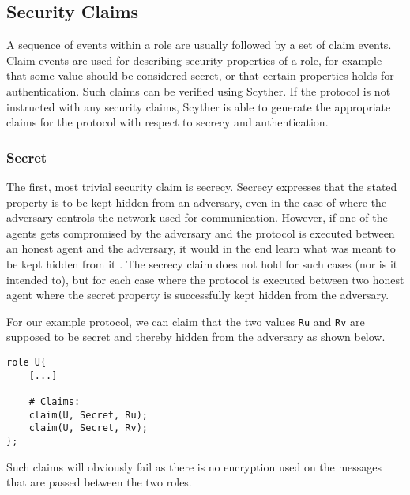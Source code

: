 %	

\subsection{Security Claims}

A sequence of events within a role are usually followed by a set of claim events. Claim events are used for describing security properties of a role, for example that some value should be considered secret, or that certain properties holds for authentication. Such claims can be verified using Scyther. If the protocol is not instructed with any security claims, Scyther is able to generate the appropriate claims  for the protocol with respect to secrecy and authentication.

\subsubsection{Secret}

The first, most trivial security claim is secrecy. Secrecy expresses that the stated property is to be kept hidden from an adversary, even in the case of where the adversary controls the network used for communication. However, if one of the agents gets compromised by the adversary and the protocol is executed between an honest agent and the adversary, it would in the end learn what was meant to be kept hidden from it \cite{cremers2005operational}. The secrecy claim does not hold for such cases (nor is it intended to), but for each case where the protocol is executed between two honest agent where the secret property is successfully kept hidden from the adversary.

For our example protocol, we can claim that the two values \texttt{Ru} and \texttt{Rv} are supposed to be secret and thereby hidden from the adversary as shown below.\newline

\begin{lstlisting}
role U{
	[...]
	
	# Claims:
	claim(U, Secret, Ru);
	claim(U, Secret, Rv);
};
\end{lstlisting}

Such claims will obviously fail as there is no encryption used on the messages that are passed between the two roles. 


